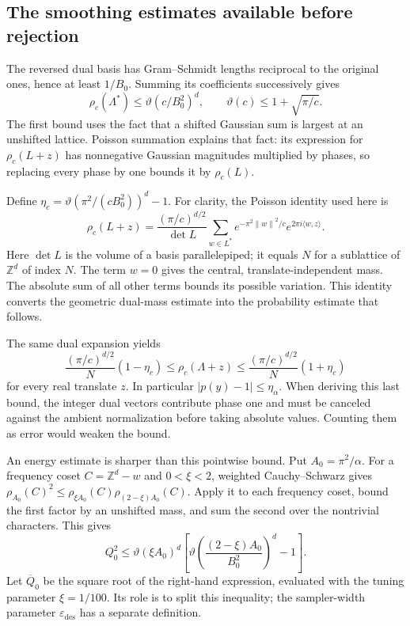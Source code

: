 \documentclass[11pt,a4paper]{article}
\newcommand{\Z}{\mathbb Z}
\newcommand{\eps}{\varepsilon}
\newcommand{\norm}[1]{\left\lVert#1\right\rVert}
\theoremstyle{definition}
\theoremstyle{remark}
\numberwithin{equation}{section}
\begin{document}
\subsection{The smoothing estimates available before rejection}

The reversed dual basis has Gram--Schmidt lengths reciprocal to the
original ones, hence at least $1/B_0$. Summing its coefficients
successively gives
\[
 \rho_c(\Lambda^*)\le\vartheta(c/B_0^2)^d,
 \qquad \vartheta(c)\le1+\sqrt{\pi/c}.
\]
The first bound uses the fact that a shifted Gaussian sum is largest at
an unshifted lattice. Poisson summation explains that fact: its expression
for $\rho_c(L+z)$ has nonnegative Gaussian magnitudes multiplied by
phases, so replacing every phase by one bounds it by $\rho_c(L)$.

Define
$\eta_c=\vartheta(\pi^2/(cB_0^2))^d-1$. For clarity, the Poisson identity used here is
\[
 \rho_c(L+z)=\frac{(\pi/c)^{d/2}}{\det L}
 \sum_{w\in L^*}e^{-\pi^2\norm{w}^2/c}
 e^{2\pi i\langle w,z\rangle}.
\]
Here $\det L$ is the volume of a basis parallelepiped; it equals $N$ for a sublattice of $\Z^d$ of index $N$. The term $w=0$ gives the central, translate-independent mass. The absolute sum of all other terms bounds its possible variation. This identity converts the geometric dual-mass estimate into the probability estimate that follows.

The same dual expansion yields
\begin{equation}
 \frac{(\pi/c)^{d/2}}N(1-\eta_c)
 \le\rho_c(\Lambda+z)
 \le\frac{(\pi/c)^{d/2}}N(1+\eta_c)
 \label{eq:norm-flat-cosets}
\end{equation}
for every real translate $z$. In particular $|p(y)-1|\le\eta_\alpha$.
When deriving this last bound, the integer dual vectors contribute
phase one and must be canceled against the ambient normalization before
taking absolute values. Counting them as error would weaken the bound.

An energy estimate is sharper than this pointwise bound. Put
$A_0=\pi^2/\alpha$. For a frequency coset $C=\Z^d-w$ and
$0<\xi<2$, weighted Cauchy--Schwarz gives
$\rho_{A_0}(C)^2\le\rho_{\xi A_0}(C)\rho_{(2-\xi)A_0}(C)$.
Apply it to each frequency coset, bound the first factor by an
unshifted mass, and sum the second over the nontrivial characters. This gives
\begin{equation}
 Q_0^2\le\vartheta(\xi A_0)^d
 \left[\vartheta\!\left(\frac{(2-\xi)A_0}{B_0^2}\right)^d-1\right].
 \label{eq:norm-Q0}
\end{equation}
Let $\overline Q_0$ be the square root of the right-hand expression,
evaluated with the tuning parameter $\xi=1/100$. Its role is to split this
inequality; the sampler-width parameter $\eps_{\mathrm{des}}$ has a separate
definition.
\end{document}
